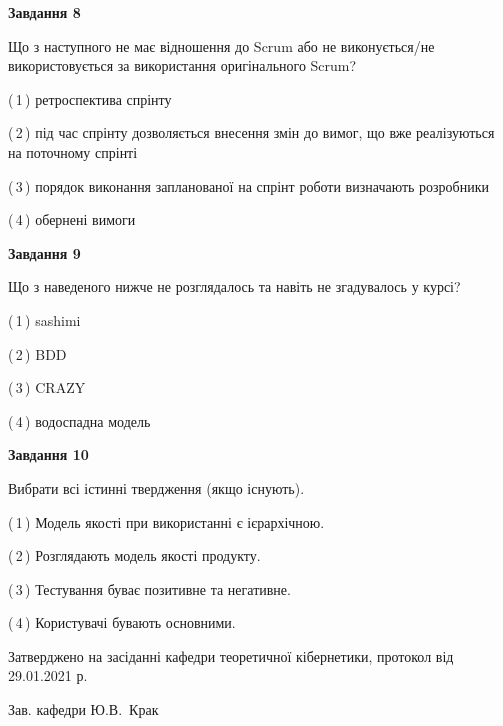 \documentclass[10pt, ukrainian]{article}
\begin{document}
{\begin {large}
{\begin {center}\textbf{Завдання 8}\end {center}}\par
Що з наступного не має відношення до Scrum або не виконується/не використовується за використання оригінального Scrum?\par
\vspace{2mm}



(\,1\,) ретроспектива спрінту%



(\,2\,) під час спрінту дозволяється внесення змін до вимог, що вже реалізуються на поточному спрінті%



(\,3\,) порядок виконання запланованої на спрінт роботи визначають розробники%



(\,4\,) обернені вимоги%


{\begin {center}\textbf{Завдання 9}\end {center}}\par
Що з наведеного нижче не розглядалось та навіть не згадувалось у курсі?\par
\vspace{2mm}



(\,1\,) sashimi%



(\,2\,) BDD%



(\,3\,) CRAZY%



(\,4\,) водоспадна модель%


{\begin {center}\textbf{Завдання 10}\end {center}}\par
Вибрати всі істинні твердження (якщо існують).\par
\vspace{2mm}



(\,1\,) Модель якості при використанні є ієрархічною.%



(\,2\,) Розглядають модель якості продукту.%



(\,3\,) Тестування буває позитивне та негативне.%



(\,4\,) Користувачі бувають основними.%



\end {large}}
{\vspace{5mm}\smallskip \begin {small} Затверджено на засіданні кафедри теоретичної кібернетики, протокол  від   29.01.2021 р.\par\smallskip\smallskip
{\parbox {6.5 cm}{Зав. кафедри \dotfill Ю.В.~Крак}} \end{small}}
\newpage
\end{document}
